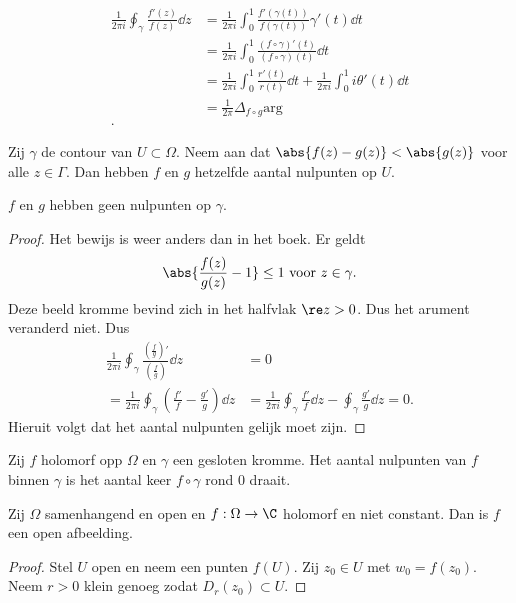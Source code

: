 \begin{align*}
	\frac{1}{2 \pi i} \oint_{\gamma} \frac{f'(z)}{f(z)}  \dd z &=  \frac{1}{2 \pi i} \int_{0}^{1} \frac{f'(\gamma(t))}{f(\gamma(t))} \gamma'(t) \dd t    \\
								   &= \frac{1}{2 \pi i} \int_{0}^{1} \frac{(f\circ \gamma)'(t)}{(f\circ \gamma)(t)} \dd t \\
								   &= \frac{1}{2\pi i} \int_{0}^{1}  \frac{r'(t)}{r(t)} \dd t + \frac{1}{2 \pi i} \int_{0}^{1} i \theta'(t) \dd t   \\
								   &= \frac{1}{2 \pi } \Delta_{f\circ g} \text{arg}\\
.\end{align*}
\begin{stelling}
	Zij $\gamma$ de contour van $U \subset \Omega$. 
	Neem aan dat $\abs{f(z) - g(z)} < \abs{g(z)}$ voor alle $z \in \Gamma$. 
	Dan hebben $f$ en $g$ hetzelfde aantal nulpunten op $U$. 
	\begin{opmerking}
		$f$ en $g$ hebben geen nulpunten op $\gamma$. 
	\end{opmerking}
\end{stelling}
\begin{proof}
	Het bewijs is weer anders dan in het boek. 
	Er geldt \[
		\abs{\frac{f(z)}{g(z)} - 1} \le 1 \text{ voor } z \in \gamma
	.\] 
	Deze beeld kromme bevind zich in het halfvlak $\re z > 0$. Dus het arument veranderd niet. 
	Dus 
	\begin{align*}
		\frac{1}{2 \pi i} \oint_{\gamma} \frac{\left( \frac{f}{g} \right) '}{\left( \frac{f}{g} \right) } \dd z &=  0 \\
		= \frac{1}{2 \pi i} \oint_{\gamma} \left( \frac{f'}{f} - \frac{g'}{g} \right) \dd z &= \frac{1}{2 \pi i} \oint_{\gamma}  \frac{f'}{f} \dd z - \oint_{\gamma} \frac{g'}{g} \dd z = 0 
	.\end{align*}
	Hieruit volgt dat het aantal nulpunten gelijk moet zijn.
\end{proof}

Zij $f$ holomorf opp $\Omega$ en $\gamma$ een gesloten kromme. 
Het aantal nulpunten van $f$ binnen $\gamma$ is het aantal keer  $f \circ \gamma$ rond 0 draait. 

\begin{stelling}
	Zij $\Omega$ samenhangend en open en $f: \Omega \to \C$ holomorf  en niet constant. 
	Dan is $f$ een open afbeelding.
\end{stelling}

\begin{proof}
	Stel $U$ open en neem een punten $f(U)$. 
	Zij $z_0 \in U$ met $w_0 = f(z_0)$.  
	Neem $r > 0 $ klein genoeg zodat $D_r(z_0) \subset U$. 
\end{proof}

